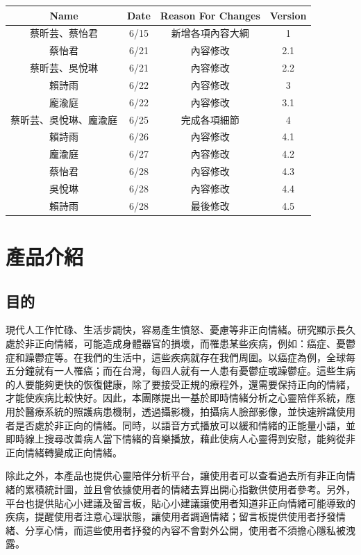 \documentclass[12pt]{scrreprt}
\begin{document}
\begin{center}
    \begin{tabular}{|c|c|c|c|}
        \hline
	    Name & Date & Reason For Changes & Version\\
        \hline
	    蔡昕芸、蔡怡君 & 6/15 & 新增各項內容大綱 & 1\\
        \hline
	    蔡怡君 & 6/21 & 內容修改 & 2.1\\
        \hline
	    蔡昕芸、吳悅琳 & 6/21 & 內容修改 & 2.2\\
        \hline
	    賴詩雨 & 6/22 & 內容修改 & 3\\
        \hline
         龐渝庭 & 6/22 & 內容修改 & 3.1\\
        \hline
         蔡昕芸、吳悅琳、龐渝庭 & 6/25 & 完成各項細節 & 4\\
        \hline
	    賴詩雨 & 6/26 & 內容修改 & 4.1\\
        \hline
         龐渝庭 & 6/27 & 內容修改 & 4.2\\
        \hline
	    蔡怡君 & 6/28 & 內容修改 & 4.3\\
        \hline
	    吳悅琳 & 6/28 & 內容修改 & 4.4\\
        \hline
	    賴詩雨 & 6/28 & 最後修改 & 4.5\\
        \hline
    \end{tabular}
\end{center}
\chapter{產品介紹}

\section{目的}

現代人工作忙碌、生活步調快，容易產生憤怒、憂慮等非正向情緒。研究顯示長久處於非正向情緒，可能造成身體器官的損壞，而罹患某些疾病，例如：癌症、憂鬱症和躁鬱症等。在我們的生活中，這些疾病就存在我們周圍。以癌症為例，全球每五分鐘就有一人罹癌；而在台灣，每四人就有一人患有憂鬱症或躁鬱症。這些生病的人要能夠更快的恢復健康，除了要接受正規的療程外，還需要保持正向的情緒，才能使疾病比較快好。因此，本團隊提出一基於即時情緒分析之心靈陪伴系統，應用於醫療系統的照護病患機制，透過攝影機，拍攝病人臉部影像，並快速辨識使用者是否處於非正向的情緒。同時，以語音方式播放可以緩和情緒的正能量小語，並即時線上搜尋改善病人當下情緒的音樂播放，藉此使病人心靈得到安慰，能夠從非正向情緒轉變成正向情緒。

除此之外，本產品也提供心靈陪伴分析平台，讓使用者可以查看過去所有非正向情緒的累積統計圖，並且會依據使用者的情緒去算出開心指數供使用者參考。另外，平台也提供貼心小建議及留言板，貼心小建議讓使用者知道非正向情緒可能導致的疾病，提醒使用者注意心理狀態，讓使用者調適情緒；留言板提供使用者抒發情緒、分享心情，而這些使用者抒發的內容不會對外公開，使用者不須擔心隱私被洩露。
\end{document}
